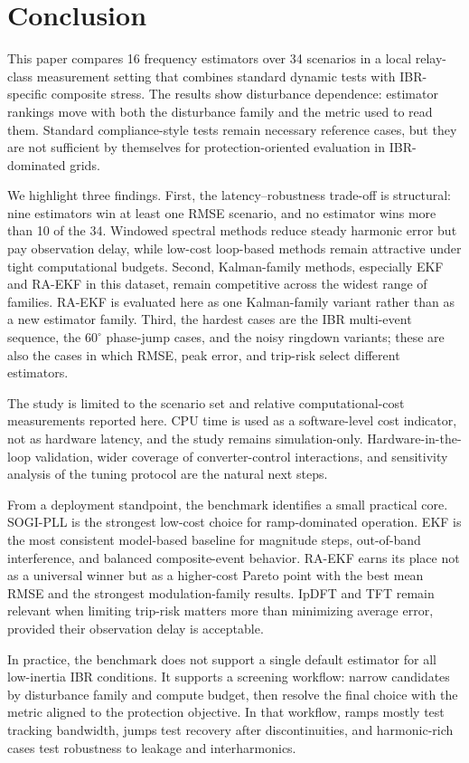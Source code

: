 \section{Conclusion}
\label{sec:conclusion}

This paper compares 16 frequency estimators over 34 scenarios in a local
relay-class measurement setting that combines standard dynamic tests with
IBR-specific composite stress. The results show disturbance dependence:
estimator rankings move with both the disturbance family and the metric used to
read them. Standard compliance-style tests remain necessary reference cases,
but they are not sufficient by themselves for protection-oriented evaluation in
IBR-dominated grids.

We highlight three findings. First, the latency--robustness trade-off is
structural: nine estimators win at least one RMSE scenario, and no estimator
wins more than 10 of the 34. Windowed spectral methods reduce steady harmonic
error but pay observation delay, while low-cost loop-based methods remain
attractive under tight computational budgets. Second, Kalman-family methods,
especially EKF and RA-EKF in this dataset, remain competitive across the
widest range of families. RA-EKF is evaluated here as one Kalman-family
variant rather than as a new estimator family. Third, the hardest cases are
the IBR multi-event sequence, the $60^\circ$ phase-jump cases, and the noisy
ringdown variants; these are also the cases in which RMSE, peak error, and
trip-risk select different estimators.

The study is limited to the scenario set and relative computational-cost
measurements reported here. CPU time is used as a software-level cost indicator,
not as hardware latency, and the study remains simulation-only. Hardware-in-the-loop
validation, wider coverage of converter-control interactions, and sensitivity
analysis of the tuning protocol are the natural next steps.

From a deployment standpoint, the benchmark identifies a small practical core.
SOGI-PLL is the strongest low-cost choice for ramp-dominated operation. EKF is
the most consistent model-based baseline for magnitude steps, out-of-band
interference, and balanced composite-event behavior. RA-EKF earns its place not
as a universal winner but as a higher-cost Pareto point with the best mean RMSE
and the strongest modulation-family results. IpDFT and TFT remain relevant when
limiting trip-risk matters more than minimizing average error, provided their
observation delay is acceptable.

In practice, the benchmark does not support a single default estimator for all
low-inertia IBR conditions. It supports a screening workflow: narrow
candidates by disturbance family and compute budget, then resolve the final
choice with the metric aligned to the protection objective. In that workflow,
ramps mostly test tracking bandwidth, jumps test recovery after
discontinuities, and harmonic-rich cases test robustness to leakage and
interharmonics.
